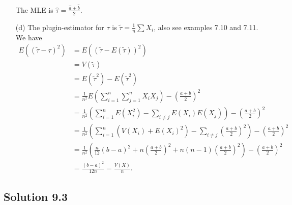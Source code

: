 \begin{itemize}
        The MLE is $\hat{\tau} = \frac{\hat{a} + \hat{b}}{2}$.
    \item[(d)] The plugin-estimator for $\tau$ is $\tilde{\tau} = \frac{1}{n} \sum X_i$, also see examples 7.10 and 7.11.
        We have
        \begin{equation*}
            \begin{split}
                E((\tilde{\tau} - \tau)^2)
                    &= E((\tilde{\tau} - E(\tilde{\tau}))^2) \\
                    &= V(\tilde{\tau}) \\
                    &= E(\tilde{\tau}^2) - E(\tilde{\tau}^2) \\
                    &= \frac{1}{n^2} E\left(\sum_{i = 1}^n \sum_{j = 1}^n X_i X_j\right) - \left(\frac{a + b}{2}\right)^2 \\
                    &= \frac{1}{n^2} \left(\sum_{i = 1}^n E(X_i^2) - \sum_{i \neq j} E(X_i) E(X_j)\right) - \left(\frac{a + b}{2}\right)^2 \\
                    &= \frac{1}{n^2} \left(\sum_{i = 1}^n (V(X_i) + E(X_i)^2) - \sum_{i \neq j} \left(\frac{a + b}{2}\right)^2\right) - \left(\frac{a + b}{2}\right)^2 \\
                    &= \frac{1}{n^2} \left(\frac{n}{12}(b - a)^2 + n\left(\frac{a + b}{2}\right)^2 + n(n - 1)\left(\frac{a + b}{2}\right)^2\right) - \left(\frac{a + b}{2}\right)^2 \\
                    &= \frac{(b - a)^2}{12 n}
                    = \frac{V(X)}{n}.
            \end{split}
        \end{equation*}
\end{itemize}


\subsection*{Solution 9.3}

